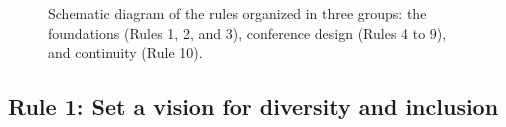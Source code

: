 \documentclass[10pt,letterpaper]{article}
\begin{document}
\begin{figure}[!h]
\centering
\caption{Schematic diagram of the rules organized in three groups: the foundations (Rules 1, 2, and 3), conference design (Rules 4 to 9), and continuity (Rule 10).}
\label{fig:diagram}
\end{figure}




\subsection*{Rule 1: Set a vision for diversity and inclusion}
\label{rule_diversity}
\end{document}

